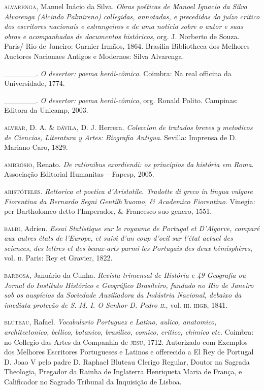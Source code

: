 \begin{Parskip}
\textsc{alvarenga}, Manuel Inácio da Silva. \emph{Obras poéticas de Manoel
Ignacio da Silva Alvarenga (Alcindo Palmireno) collegidas, annotadas, e precedidas do juízo crítico dos escritores nacionais e
estrangeiros e de uma notícia sobre o autor e suas obras e acompanhadas de documentos históricos}, org. J. Norberto de Souza.
Paris/ Rio de Janeiro: Garnier Irmãos, 1864. Brasilia Bibliotheca dos Melhores Auctores Nacionaes Antigos e Modernos:
Silva Alvarenga.

\_\_\_\_\_\_. \emph{O desertor: poema herói-cômico}. Coimbra: Na real
officina da Universidade, 1774.

\_\_\_\_\_\_. \emph{O desertor: poema herói-cômico}, org. Ronald Polito.
Campinas: Editora da Unicamp, 2003.

\textsc{alvear}, D. A. \& \textsc{dávila}, D. J. Herrera. \emph{Coleccion de tratados
breves y metodicos de Ciencias, Literatura y Artes: Biografia
Antigua}. Sevilla: Imprensa de D. Mariano Caro, 1829.

\textsc{ambrósio}, Renato. \emph{De rationibus exordiendi: os princípios da
história em Roma}. Associação Editorial Humanitas – Fapesp,
2005.

\textsc{aristóteles}. \emph{Rettorica et poetica d’Aristotile. Tradotte di greco
in lingua vulgare Fiorentina da Bernardo Segni Gentilh’huomo,
\& Academico Fiorentino}. Vinegia: per Bartholomeo detto
l’Imperador, \& Francesco suo genero, 1551.

\textsc{balbi}, Adrien. \emph{Essai Statistique sur le royaume de Portugal et
D’Algarve, comparé aux autres états de l’Europe, et suivi d’un
coup d’oeil sur l’état actuel des sciences, des lettres et des beaux-arts parmi les Portugais des deux hémisphères}, vol. \textsc{ii}. Paris: Rey et Gravier, 1822.

\textsc{barbosa}, Januário da Cunha. \emph{Revista trimensal de História e 49
Geografia ou Jornal do Instituto Histórico e Geográfico Brasileiro, fundado no Rio de Janeiro sob os auspícios da Sociedade
Auxiliadora da Indústria Nacional, debaixo da imediata proteção
de S. M. I. O Senhor D. Pedro \textsc{ii}}., vol. \textsc{iii}. \textsc{ihgb}, 1841.

\textsc{bluteau}, Rafael. \emph{Vocabulario Portuguez e Latino, aulico, anatomico, architectonico, bellico, botanico, brasilico, comico, critico,
chimico etc.} Coimbra: no Collegio das Artes da Companhia de
\textsc{jesu}, 1712. Autorizado com Exemplos dos Melhores Escritores
Portugueses e Latinos e offerecido a El Rey de Portugal D. Joao
V pelo padre D. Raphael Bluteau Clerigo Regular, Doutor na
Sagrada Theologia, Pregador da Rainha de Inglaterra Henriqueta Maria de França, e Calificador no Sagrado Tribunal da
Inquisição de Lisboa.


\end{Parskip}
